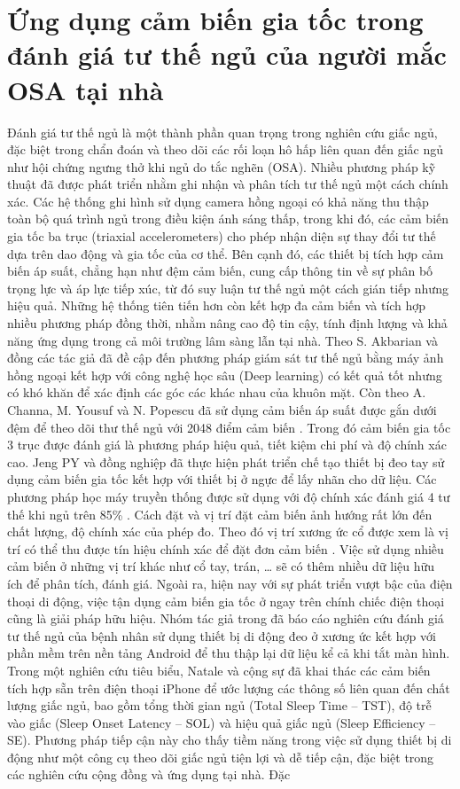 \section{Ứng dụng cảm biến gia tốc trong đánh giá tư thế ngủ của người mắc OSA tại nhà}
Đánh giá tư thế ngủ là một thành phần quan trọng trong nghiên cứu giấc ngủ, đặc biệt trong chẩn đoán và theo dõi các rối loạn hô hấp liên quan đến giấc ngủ như hội chứng ngưng thở khi ngủ do tắc nghẽn (OSA). Nhiều phương pháp kỹ thuật đã được phát triển nhằm ghi nhận và phân tích tư thế ngủ một cách chính xác. Các hệ thống ghi hình sử dụng camera hồng ngoại có khả năng thu thập toàn bộ quá trình ngủ trong điều kiện ánh sáng thấp, trong khi đó, các cảm biến gia tốc ba trục (triaxial accelerometers) cho phép nhận diện sự thay đổi tư thế dựa trên dao động và gia tốc của cơ thể. Bên cạnh đó, các thiết bị tích hợp cảm biến áp suất, chẳng hạn như đệm cảm biến, cung cấp thông tin về sự phân bố trọng lực và áp lực tiếp xúc, từ đó suy luận tư thế ngủ một cách gián tiếp nhưng hiệu quả. Những hệ thống tiên tiến hơn còn kết hợp đa cảm biến và tích hợp nhiều phương pháp đồng thời, nhằm nâng cao độ tin cậy, tính định lượng và khả năng ứng dụng trong cả môi trường lâm sàng lẫn tại nhà. Theo S. Akbarian và đồng các tác giả đã đề cập đến phương pháp giám sát tư thế ngủ bằng máy ảnh hồng ngoại kết hợp với công nghệ học sâu (Deep learning) \cite{Akbarian_osa} có kết quả tốt nhưng có khó khăn để xác định các góc các khác nhau của khuôn mặt. Còn theo A. Channa, M. Yousuf và N. Popescu đã sử dụng cảm biến áp suất được gắn dưới đệm để theo dõi thư thế ngủ với 2048 điểm cảm biến \cite{Channa_osa}. Trong đó cảm biến gia tốc 3 trục được đánh giá là phương pháp hiệu quả, tiết kiệm chi phí và độ chính xác cao. Jeng PY và đồng nghiệp đã thực hiện phát triển chế tạo thiết bị đeo tay sử dụng cảm biến gia tốc kết hợp với thiết bị ở ngực để lấy nhãn cho dữ liệu. Các phương pháp học máy truyền thống được sử dụng với độ chính xác đánh giá 4 tư thế khi ngủ trên 85\% \cite{Jeng_osa}. Cách đặt và vị trí đặt cảm biến ảnh hướng rất lớn đến chất lượng, độ chính xác của phép đo. Theo đó vị trí xương ức cổ được xem là vị trí có thể thu được tín hiệu chính xác để đặt đơn cảm biến \cite{Zhang_osa}. Việc sử dụng nhiều cảm biến ở những vị trí khác như cổ tay, trán, … sẽ có thêm nhiều dữ liệu hữu ích để phân tích, đánh giá. Ngoài ra, hiện nay với sự phát triển vượt bậc của điện thoại di động, việc tận dụng cảm biến gia tốc ở ngay trên chính chiếc điện thoại cũng là giải pháp hữu hiệu. Nhóm tác giả trong \cite{Ferrer_osa} đã báo cáo nghiên cứu đánh giá tư thế ngủ của bệnh nhân sử dụng thiết bị di động đeo ở xương ức kết hợp với phần mềm trên nền tảng Android để thu thập lại dữ liệu kể cả khi tắt màn hình. Trong một nghiên cứu tiêu biểu, Natale và cộng sự đã khai thác các cảm biến tích hợp sẵn trên điện thoại iPhone để ước lượng các thông số liên quan đến chất lượng giấc ngủ, bao gồm tổng thời gian ngủ (Total Sleep Time – TST), độ trễ vào giấc (Sleep Onset Latency – SOL) và hiệu quả giấc ngủ (Sleep Efficiency – SE). Phương pháp tiếp cận này cho thấy tiềm năng trong việc sử dụng thiết bị di động như một công cụ theo dõi giấc ngủ tiện lợi và dễ tiếp cận, đặc biệt trong các nghiên cứu cộng đồng và ứng dụng tại nhà\cite{Natale_osa}. Đặc 